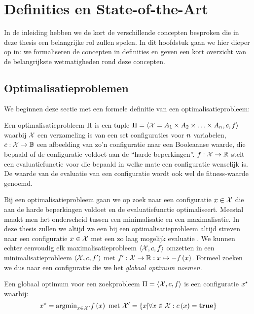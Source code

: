 \chapter{Definities en State-of-the-Art}
\label{hoofdstuk:1}

In de inleiding hebben we de kort de verschillende concepten besproken die in deze thesis een belangrijke rol zullen spelen. In dit hoofdstuk gaan we hier dieper op in: we formaliseren de concepten in definities en geven een kort overzicht van de belangrijkste wetmatigheden rond deze concepten.

\section{Optimalisatieproblemen}

We beginnen deze sectie met een formele definitie van een optimalisatieprobleem:

\begin{definition}[Optimalisatieprobleem]%
Een optimalisatieprobleem $\Pi$ is een tuple $\Pi=\left\langle \mathcal{X}=A_1\times A_2\times\ldots\times A_{n},c,f\right\rangle$ waarbij $\mathcal{X}$ een verzameling is van een set configuraties voor $n$ variabelen, $c:\mathcal{X}\rightarrow \mathbb{B}$ een afbeelding van zo'n configuratie naar een Booleaanse waarde, die bepaald of de configuratie voldoet aan de ``harde beperkingen''. $f:\mathcal{X}\rightarrow \mathbb{R}$ stelt een evaluatiefunctie voor die bepaald in welke mate een configuratie wenselijk is. De waarde van de evaluatie van een configuratie  wordt ook wel de fitness-waarde genoemd.
\end{definition}
Bij een optimalisatieprobleem gaan we op zoek naar een configuratie $x\in\mathcal{X}$ die aan de harde beperkingen voldoet en de evaluatiefunctie optimaliseert. Meestal maakt men het onderscheid tussen een minimalisatie en een maximalisatie. In deze thesis zullen we altijd we een bij een optimalisatieprobleem altijd streven naar een configuratie $x\in\mathcal{X}$ met een zo laag mogelijk evaluatie . We kunnen echter eenvoudig elk maximalisatieprobleem $\left\langle \mathcal{X},c,f\right\rangle$ omzetten in een minimalisatieprobleem $\left\langle \mathcal{X},c,f'\right\rangle$ met $f':\mathcal{X}\rightarrow \mathbb{R}:x\mapsto -f\left(x\right)$. Formeel zoeken we dus naar een configuratie \xstar{} die we het \emph{globaal optimum noemen}.

\begin{definition}
Een globaal optimum voor een zoekprobleem $\Pi=\left\langle \mathcal{X},c,f\right\rangle$ is een configuratie $x^{\star}$ waarbij:
\begin{equation}
x^{\star}=\displaystyle\mbox{argmin}_{x\in\mathcal{X}'}f\left(x\right)\mbox{ met }\mathcal{X}'=\left\{ x|\forall x\in\mathcal{X}:c\left(x\right)=\mbox{\textbf{true}}\right\}
\end{equation}
\end{definition}

